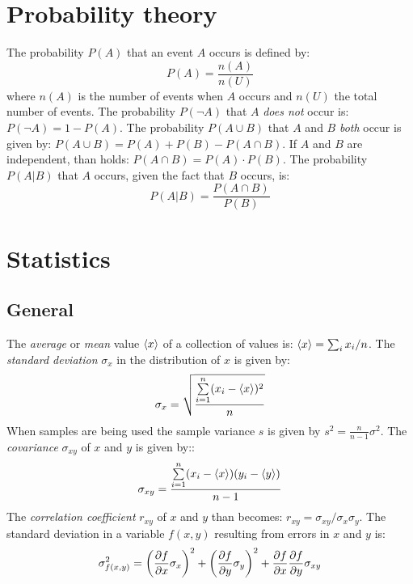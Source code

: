 \documentclass[twoside]{report}
\begin{document}
\section{Probability theory}
The probability $P(A)$ that an event $A$ occurs is defined by:
\[
P(A)=\frac{n(A)}{n(U)}
\]
where $n(A)$ is the number of events when $A$ occurs and $n(U)$ the total
number of events.
\npar
The probability $P(\neg A)$ that $A$ {\it does not} occur is: $P(\neg A)=1-P(A)$.
The probability $P(A\cup B)$ that $A$ and $B$ {\it both} occur is given by:
$P(A\cup B)=P(A)+P(B)-P(A\cap B)$. If $A$ and $B$ are independent, than holds:
$P(A\cap B)=P(A)\cdot P(B)$.
\npar
The probability $P(A|B)$ that $A$ occurs, given the fact that $B$ occurs, is:
\[
P(A|B)=\frac{P(A\cap B)}{P(B)}
\]

\section{Statistics}
\subsection{General}
The {\it average} or {\it mean} value $\left\langle x \right\rangle$ of a collection of values is:
$\left\langle x \right\rangle=\sum_i x_i/n$. The {\it standard deviation} $\sigma_x$ in the
distribution of $x$ is given by:
\[
\sigma_x=\sqrt{\frac{\sum\limits_{i=1}^n(x_i-\left\langle x \right\rangle)^2}{n}}
\]
When samples are being used the sample variance $s$ is given by
$\displaystyle s^2=\frac{n}{n-1}\sigma^2$.
\npar
The {\it covariance} $\sigma_{xy}$ of $x$ and $y$ is given by::
\[
\sigma_{xy}=\frac{\sum\limits_{i=1}^n(x_i-\left\langle x \right\rangle)(y_i-\left\langle y \right\rangle)}{n-1}
\]
The {\it correlation coefficient} $r_{xy}$ of $x$ and $y$ than becomes:
$r_{xy}=\sigma_{xy}/\sigma_x\sigma_y$.
\npar
The standard deviation in a variable $f(x,y)$ resulting from errors in
$x$ and $y$ is:
\[
\sigma^2_{f(x,y)}=\left(\frac{\partial f}{\partial x}\sigma_x\right)^2+\left(\frac{\partial f}{\partial y}\sigma_y\right)^2+
\frac{\partial f}{\partial x}\frac{\partial f}{\partial y}\sigma_{xy}
\]
\end{document}
